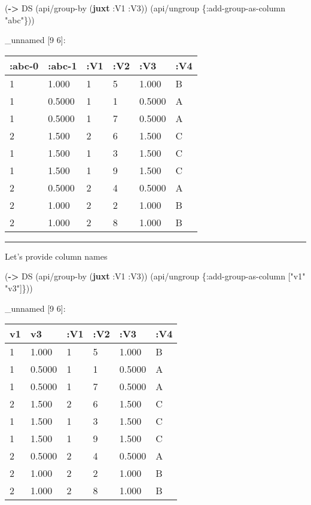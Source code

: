 \documentclass[]{article}
\newenvironment{Shaded}{\begin{snugshade}}{\end{snugshade}}
\newcommand{\KeywordTok}[1]{\textcolor[rgb]{0.13,0.29,0.53}{\textbf{#1}}}
\newcommand{\StringTok}[1]{\textcolor[rgb]{0.31,0.60,0.02}{#1}}
\newcommand{\AttributeTok}[1]{\textcolor[rgb]{0.77,0.63,0.00}{#1}}
\newcommand{\NormalTok}[1]{#1}
\begin{document}
\begin{Shaded}
\begin{Highlighting}[]
\NormalTok{(}\KeywordTok{->}\NormalTok{ DS}
\NormalTok{    (api/group-by (}\KeywordTok{juxt} \AttributeTok{:V1} \AttributeTok{:V3}\NormalTok{))}
\NormalTok{    (api/ungroup \{}\AttributeTok{:add-group-as-column} \StringTok{"abc"}\NormalTok{\}))}
\end{Highlighting}
\end{Shaded}

\_unnamed {[}9 6{]}:

\begin{longtable}[]{@{}llllll@{}}
\toprule
:abc-0 & :abc-1 & :V1 & :V2 & :V3 & :V4\tabularnewline
\midrule
\endhead
1 & 1.000 & 1 & 5 & 1.000 & B\tabularnewline
1 & 0.5000 & 1 & 1 & 0.5000 & A\tabularnewline
1 & 0.5000 & 1 & 7 & 0.5000 & A\tabularnewline
2 & 1.500 & 2 & 6 & 1.500 & C\tabularnewline
1 & 1.500 & 1 & 3 & 1.500 & C\tabularnewline
1 & 1.500 & 1 & 9 & 1.500 & C\tabularnewline
2 & 0.5000 & 2 & 4 & 0.5000 & A\tabularnewline
2 & 1.000 & 2 & 2 & 1.000 & B\tabularnewline
2 & 1.000 & 2 & 8 & 1.000 & B\tabularnewline
\bottomrule
\end{longtable}

\begin{center}\rule{0.5\linewidth}{0.5pt}\end{center}

Let's provide column names

\begin{Shaded}
\begin{Highlighting}[]
\NormalTok{(}\KeywordTok{->}\NormalTok{ DS}
\NormalTok{    (api/group-by (}\KeywordTok{juxt} \AttributeTok{:V1} \AttributeTok{:V3}\NormalTok{))}
\NormalTok{    (api/ungroup \{}\AttributeTok{:add-group-as-column}\NormalTok{ [}\StringTok{"v1"} \StringTok{"v3"}\NormalTok{]\}))}
\end{Highlighting}
\end{Shaded}

\_unnamed {[}9 6{]}:

\begin{longtable}[]{@{}llllll@{}}
\toprule
v1 & v3 & :V1 & :V2 & :V3 & :V4\tabularnewline
\midrule
\endhead
1 & 1.000 & 1 & 5 & 1.000 & B\tabularnewline
1 & 0.5000 & 1 & 1 & 0.5000 & A\tabularnewline
1 & 0.5000 & 1 & 7 & 0.5000 & A\tabularnewline
2 & 1.500 & 2 & 6 & 1.500 & C\tabularnewline
1 & 1.500 & 1 & 3 & 1.500 & C\tabularnewline
1 & 1.500 & 1 & 9 & 1.500 & C\tabularnewline
2 & 0.5000 & 2 & 4 & 0.5000 & A\tabularnewline
2 & 1.000 & 2 & 2 & 1.000 & B\tabularnewline
2 & 1.000 & 2 & 8 & 1.000 & B\tabularnewline
\bottomrule
\end{longtable}
\end{document}
